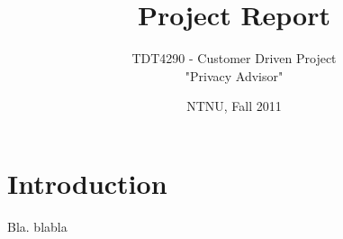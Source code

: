 \documentclass[11pt]{book}
\title{Project Report}
\author{TDT4290 - Customer Driven Project \\ "Privacy Advisor"}
\date{NTNU, Fall 2011}
\begin{document}
\frontmatter
\maketitle

\dominitoc
\tableofcontents

\chapter{Introduction}

Bla. blabla











\end{document}
